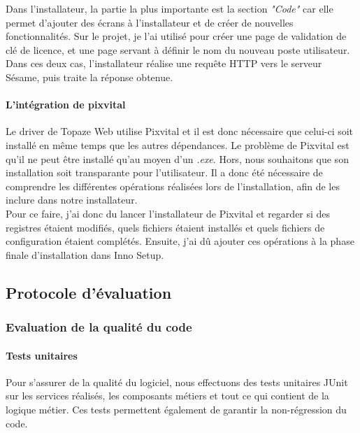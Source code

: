 Dans l'installateur, la partie la plus importante est la section \textit{"Code"} car elle permet d'ajouter des écrans à l'installateur et de créer de nouvelles fonctionnalités. Sur le projet, je l'ai utilisé pour créer une page de validation de clé de licence, et une page servant à définir le nom du nouveau poste utilisateur.\\
Dans ces deux cas, l'installateur réalise une requête HTTP vers le serveur Sésame, puis traite la réponse obtenue. 

\paragraph*{L'intégration de pixvital\\}

Le driver de Topaze Web utilise Pixvital et il est donc nécessaire que celui-ci soit installé en même temps que les autres dépendances. Le problème de Pixvital est qu'il ne peut être installé qu'au moyen d'un \textit{.exe}. Hors, nous souhaitons que son installation soit transparante pour l'utilisateur. Il a donc été nécessaire de comprendre les différentes opérations réalisées lors de l'installation, afin de les inclure dans notre installateur.\\
Pour ce faire, j'ai donc du lancer l'installateur de Pixvital et regarder si des registres étaient modifiés, quels fichiers étaient installés et quels fichiers de configuration étaient complétés. Ensuite, j'ai dû ajouter ces opérations à la phase finale d'installation dans Inno Setup.


\subsection{Protocole d'évaluation}
\subsubsection{Evaluation de la qualité du code}
\paragraph*{Tests unitaires\\}
Pour s'assurer de la qualité du logiciel, nous effectuons des tests unitaires JUnit sur les services réalisés, les composants métiers et tout ce qui contient de la logique métier. Ces tests permettent également de garantir la non-régression du code.

